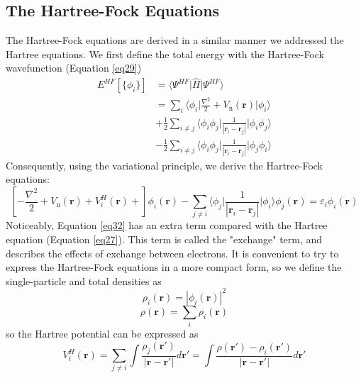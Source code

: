 \subsection{The Hartree-Fock Equations}
The Hartree-Fock equations are derived in a similar manner we addressed the Hartree equations. We first define the total energy with the Hartree-Fock wavefunction (Equation \ref{eq29}) 
\begin{equation}
  \label{eq31}
  \begin{split}
    E^{HF}[\{\phi_i\}] &= \bigg\langle \Psi^{HF} \bigg| \hat{H} \bigg| \Psi^{HF} \bigg\rangle\\
    &= \sum_{i} \langle \phi_i \big|\frac{\nabla^2}{2} + V_{\text{n}}(\mathbf{r})\big| \phi_i \rangle\\
    &+ \frac{1}{2} \sum_{i\neq j} \langle \phi_i \phi_j \big| \frac{1}{|\mathbf{r}_i - \mathbf{r}_j|} \big| \phi_i \phi_j\rangle\\
    &- \frac{1}{2} \sum_{i\neq j} \langle \phi_i \phi_j \big| \frac{1}{|\mathbf{r}_i - \mathbf{r}_j|} \big| \phi_j \phi_i\rangle
  \end{split}
\end{equation}
Consequently, using the variational principle, we derive the Hartree-Fock equations: 
\begin{equation}
  \label{eq32}
  \left[-\frac{\nabla^2}{2} + V_{\text{n}}(\mathbf{r}) + V^H_i(\mathbf{r}) +\right]\phi_i(\mathbf{r})
  - \sum_{j\neq i} \langle \phi_j \big| \frac{1}{|\mathbf{r}_i - \mathbf{r}_j|} \big| \phi_i \rangle \phi_j(\mathbf{r})
  = \varepsilon_i \phi_i(\mathbf{r})
\end{equation}
Noticeably, Equation \ref{eq32} has an extra term compared with the Hartree equation (Equation \ref{eq27}). This term is called the "exchange" term\supercite{kaxiras2003atomic}, and describes the effects of exchange between electrons. It is convenient to try to express the Hartree-Fock equations in a more compact form, so we define the single-particle and total densities as 
\begin{equation}
  \label{eq33}
  \rho_i(\mathbf{r}) = |\phi_i(\mathbf{r})|^2
\end{equation}
\begin{equation}
  \label{eq34}
  \rho(\mathbf{r}) = \sum_i \rho_i(\mathbf{r}) 
\end{equation}
so the Hartree potential can be expressed as 
\begin{equation}
  \label{eq35}
  V^H_i(\mathbf{r}) = \sum_{j\neq i}  \int \frac{\rho_j(\mathbf{r'})}{|\mathbf{r} - \mathbf{r'}|} d\mathbf{r'} 
  = \int \frac{\rho(\mathbf{r'}) - \rho_i(\mathbf{r'})}{|\mathbf{r} - \mathbf{r'}|} d\mathbf{r'}
\end{equation}
